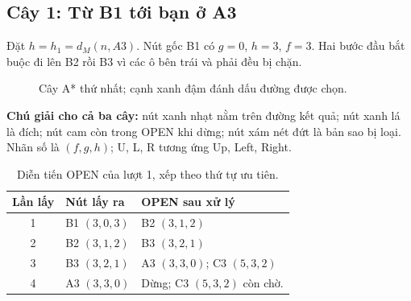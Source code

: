 \clearpage
\subsection{Cây 1: Từ B1 tới bạn ở A3}

Đặt $h=h_1=d_M(n,A3)$. Nút gốc B1 có $g=0$, $h=3$, $f=3$. Hai bước đầu bắt buộc đi lên B2 rồi B3 vì các ô bên trái và phải đều bị chặn.

\begin{figure}[ht!]
    \centering
    \caption{Cây A* thứ nhất; cạnh xanh đậm đánh dấu đường được chọn.}
\end{figure}

\noindent\textbf{Chú giải cho cả ba cây:} nút xanh nhạt nằm trên đường kết quả; nút xanh lá là đích; nút cam còn trong OPEN khi dừng; nút xám nét đứt là bản sao bị loại. Nhãn số là $(f,g,h)$; U, L, R tương ứng Up, Left, Right.

\begin{table}[ht!]
    \centering
    \caption{Diễn tiến OPEN của lượt 1, xếp theo thứ tự ưu tiên.}
    \small
    \renewcommand{\arraystretch}{1.3}
    \begin{tabularx}{\textwidth}{c l X}
        \toprule
        \textbf{Lần lấy} & \textbf{Nút lấy ra} & \textbf{OPEN sau xử lý} \\
        \midrule
        1 & B1 $(3,0,3)$ & B2 $(3,1,2)$ \\
        2 & B2 $(3,1,2)$ & B3 $(3,2,1)$ \\
        3 & B3 $(3,2,1)$ & A3 $(3,3,0)$; C3 $(5,3,2)$ \\
        4 & A3 $(3,3,0)$ & Dừng; C3 $(5,3,2)$ còn chờ. \\
        \bottomrule
    \end{tabularx}
\end{table}


